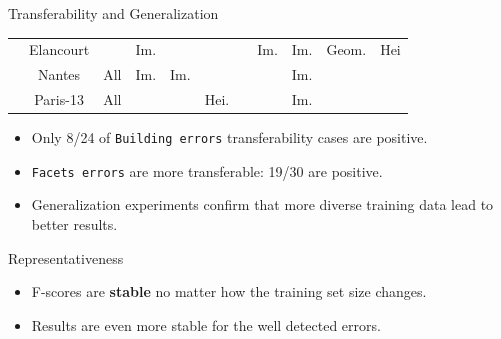 \documentclass[10pt, export]{beamer}
\begin{document}
\begin{frame}{Transferability and Generalization}
{\begin{table}
\begin{center}
\begin{tabular}{c c| x{.4cm} x{.4cm} x{.4cm} x{.4cm} |x{.4cm} x{.4cm} x{.4cm} x{.55cm} x{.4cm}}
                            \hline
                            &Elancourt & & Im.& & & &Im. &Im. &Geom. &  Hei\\
                            &Nantes   & All& Im.&Im. & & & & Im.&  &\\
                            &Paris-13   &All & &  &Hei. & & &Im. &  &\\
                            \hline
                        \end{tabular}
                    \end{center}
                \end{table}
                \begin{itemize}[label=$\blacktriangleright$, font=\color{IGNGreen}]
                    \item<2-> \footnotesize Only 8/24 of \texttt{Building errors} transferability cases are \textcolor{IGNGreen}{positive}.
                    \item<3-> \footnotesize \texttt{Facets errors} are more transferable: 19/30 are \textcolor{IGNGreen}{positive}.
                    \item<4-> \footnotesize Generalization experiments confirm that more diverse training data lead to better results.
                \end{itemize}
            }
        \end{frame}
        \begin{frame}{Representativeness}
            \begin{figure}
                
            \end{figure}
            \begin{itemize}[label=$\blacktriangleright$, font=\color{IGNGreen}]
                \item<2-> F-scores are \textbf{stable} no matter how the training set size changes.
                \item<3-> Results are even more stable for the well detected errors.
            \end{itemize}
        \end{frame}
\end{document}
